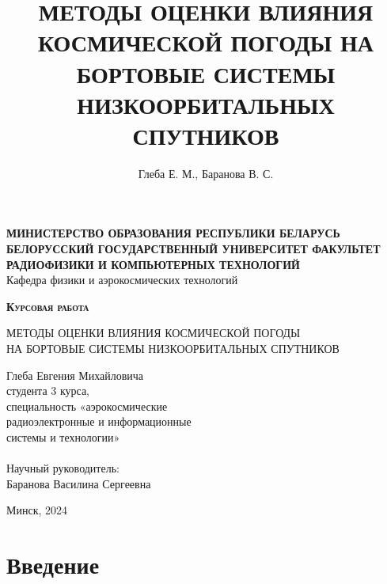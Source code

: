 \documentclass[12pt, a4paper]{extreport}
\title{МЕТОДЫ ОЦЕНКИ ВЛИЯНИЯ КОСМИЧЕСКОЙ ПОГОДЫ НА БОРТОВЫЕ СИСТЕМЫ НИЗКООРБИТАЛЬНЫХ СПУТНИКОВ}
\author{Глеба Е. М., Баранова В. С.}
\begin{document}
\begin{titlepage}
    \begin{center}
        \Large \textbf{МИНИСТЕРСТВО ОБРАЗОВАНИЯ РЕСПУБЛИКИ БЕЛАРУСЬ БЕЛОРУССКИЙ ГОСУДАРСТВЕННЫЙ УНИВЕРСИТЕТ
            ФАКУЛЬТЕТ РАДИОФИЗИКИ И КОМПЬЮТЕРНЫХ ТЕХНОЛОГИЙ
        } \\
        Кафедра физики и аэрокосмических технологий
    \end{center}

    \vspace{5em}

    \begin{center}
        \Huge \textsc{\textbf{Курсовая работа}}
    \end{center}

    \begin{center}
        \Large МЕТОДЫ ОЦЕНКИ ВЛИЯНИЯ КОСМИЧЕСКОЙ ПОГОДЫ \\
        НА БОРТОВЫЕ СИСТЕМЫ НИЗКООРБИТАЛЬНЫХ СПУТНИКОВ
    \end{center}

    \vspace{2em}

    \hfill
    \parbox{14em}{
        Глеба Евгения Михайловича \\
        студента 3 курса, \\
        специальность «аэрокосмические \\
        радиоэлектронные и информационные \\
        системы и технологии» \\
        \\
        Научный руководитель: \\
        Баранова Василина Сергеевна \\
    }


    \begin{center}
        Минск, 2024
    \end{center}

\end{titlepage}

\tableofcontents

\newpage

\section{Введение}
\end{document}
